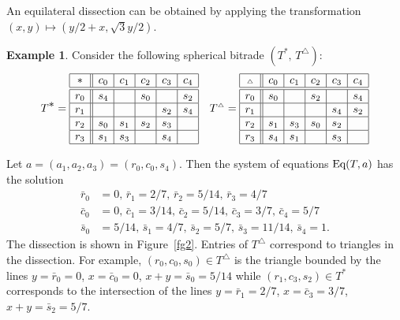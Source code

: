 \documentclass[12pt,amstags,fleqn]{article}
\theoremstyle{plain}
\theoremstyle{definition}
\newtheorem{example}[theorem]{Example}
\def\ll{{\textstyle \ast}}
\def\rr{{\scriptscriptstyle \triangle}}
\begin{document}
An equilateral dissection can be obtained by applying the transformation
$(x,y) \mapsto (y/2 + x, \sqrt 3 y/2)$.

\begin{example}
Consider the following spherical bitrade 
$(T^{\ll},\, T^{\rr})$:  \\ 
\[
T^{\ll} = 
\begin{array}{|c||c|c|c|c|c|}
\hline \ll & c_0 & c_1 & c_2 & c_3 & c_4\\
\hline \hline r_0 & s_4 & ~ & s_0 & ~ & s_2\\
\hline r_1 & ~ & ~ & ~ & s_2 & s_4\\
\hline r_2 & s_0 & s_1 & s_2 & s_3 & ~\\
\hline r_3 & s_1 & s_3 & ~ & s_4 & ~\\
\hline \end{array} 
\quad 
T^{\rr} = 
\begin{array}{|c||c|c|c|c|c|}
\hline \rr & c_0 & c_1 & c_2 & c_3 & c_4\\
\hline \hline r_0 & s_0 & ~ & s_2 & ~ & s_4\\
\hline r_1 & ~ & ~ & ~ & s_4 & s_2\\
\hline r_2 & s_1 & s_3 & s_0 & s_2 & ~\\
\hline r_3 & s_4 & s_1 & ~ & s_3 & ~\\
\hline \end{array}
\label{eqnsphericalbitrade}
\]

Let $a = (a_1,a_2,a_3) = (r_0,c_0,s_4)$. Then the system of equations
$\textnormal{Eq}(T, a)$ has the solution
\begin{align*}
\bar r_0 &= 0,\, \bar r_1 = 2/7,\, \bar r_2 = 5/14,\, \bar r_3 = 4/7 \\
\bar c_0 &= 0,\, \bar c_1 = 3/14,\, \bar c_2 = 5/14,\, \bar c_3 = 3/7,\, \bar c_4 = 5/7 \\
\bar s_0 &= 5/14,\, \bar s_1 = 4/7,\, \bar s_2 = 5/7,\, \bar s_3 = 11/14,\, \bar s_4 = 1.
\end{align*}
The dissection is shown in Figure~\ref{fg2}.
 Entries of
$T^{\rr}$ correspond to triangles in the dissection. For example,
$(r_0,c_0,s_0) \in T^{\rr}$ is the triangle bounded by the lines
$y = \bar r_0 = 0$, 
$x = \bar c_0 = 0$, 
$x+y = \bar s_0 = 5/14$ while 
$(r_1,c_3,s_2) \in T^{\ll}$ corresponds to the intersection of the
lines
$y = \bar r_1 = 2/7$, 
$x = \bar c_3 = 3/7$, 
$x+y = \bar s_2 = 5/7$.
\end{example}
\end{document}
